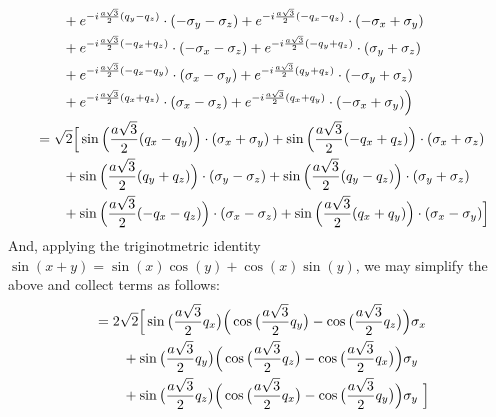 \documentclass[10pt,a4paper]{article}
\begin{document}
\begin{multicols}{2}
\begin{align*}
&\hspace{0.8cm} + e^{-i\frac{a\sqrt{3}}{2}(q_y-q_z)}\cdot (-\sigma_y - \sigma_z)+ e^{-i\frac{a\sqrt{3}}{2}(-q_x-q_z)}\cdot (-\sigma_x + \sigma_y)\\
&\hspace{0.8cm} + e^{-i\frac{a\sqrt{3}}{2}(-q_x+q_z)}\cdot (-\sigma_x - \sigma_z)+ e^{-i\frac{a\sqrt{3}}{2}(-q_y+q_z)}\cdot (\sigma_y+ \sigma_z)\\
&\hspace{0.8cm} + e^{-i\frac{a\sqrt{3}}{2}(-q_x-q_y)}\cdot (\sigma_x - \sigma_y)+ e^{-i\frac{a\sqrt{3}}{2}(q_y+q_z)}\cdot (-\sigma_y + \sigma_z)\\
&\hspace{0.8cm} + e^{-i\frac{a\sqrt{3}}{2}(q_x+q_z)}\cdot (\sigma_x - \sigma_z)+ e^{-i\frac{a\sqrt{3}}{2}(q_x+q_y)}\cdot (-\sigma_x + \sigma_y)\Big)\\
& \ = \sqrt{2} \Big[\sin\Big(\frac{a\sqrt{3}}{2}(q_x-q_y)\Big) \cdot (\sigma_x + \sigma_y)+\sin\Big(\frac{a\sqrt{3}}{2}(-q_x+q_z)\Big) \cdot (\sigma_x + \sigma_z)\\
&\hspace{0.8cm} +\sin\Big(\frac{a\sqrt{3}}{2}(q_y+q_z)\Big) \cdot (\sigma_y - \sigma_z)+\sin\Big(\frac{a\sqrt{3}}{2}(q_y-q_z)\Big) \cdot (\sigma_y + \sigma_z)\\
&\hspace{0.8cm} +\sin\Big(\frac{a\sqrt{3}}{2}(-q_x-q_z)\Big) \cdot (\sigma_x - \sigma_z)+\sin\Big(\frac{a\sqrt{3}}{2}(q_x+q_y)\Big) \cdot (\sigma_x - \sigma_y)\Big]\\
\end{align*}\normalsize
And, applying the triginotmetric identity $\sin(x+y)=\sin(x)\cos(y)+\cos(x)\sin(y)$, we may simplify the above and collect terms as follows:\footnotesize
\begin{align*}
&\ = 2\sqrt{2}\Big[ \sin\big( \frac{a\sqrt{3}}{2} q_x\big) \Big( \cos\big( \frac{a\sqrt{3}}{2} q_y\big) -\cos\big( \frac{a\sqrt{3}}{2} q_z\big) \Big) \sigma_x \\
&\hspace{0.83cm} +\sin\big( \frac{a\sqrt{3}}{2} q_y\big) \Big( \cos\big( \frac{a\sqrt{3}}{2} q_z\big) -\cos\big( \frac{a\sqrt{3}}{2} q_x\big) \Big) \sigma_y\\
&\hspace{0.83cm} +\sin\big( \frac{a\sqrt{3}}{2} q_z\big) \Big( \cos\big( \frac{a\sqrt{3}}{2} q_x\big) -\cos\big( \frac{a\sqrt{3}}{2} q_y\big) \Big) \sigma_y\ \Big]\\
\end{align*}\normalsize

\end{multicols}
\end{document}
